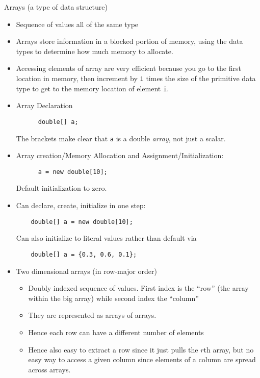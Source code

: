 \documentclass[12pt]{article}
\theoremstyle{plain}
\theoremstyle{definition}
\theoremstyle{remark}
\begin{document}
\clearpage



\clearpage
Arrays (a type of data structure)
\begin{itemize}
  \item Sequence of values all of the same type
  \item Arrays store information in a blocked portion of memory, using
    the data types to determine how much memory to allocate.
  \item Accessing elements of array are very efficient because you go to
    the first location in memory, then increment by \texttt{i} times the
    size of the primitive data type to get to the memory location of
    element \texttt{i}.
  \item Array Declaration
    \begin{lstlisting}
      double[] a;
    \end{lstlisting}
    The brackets make clear that \texttt{a} is a double \emph{array},
    not just a scalar.
  \item Array creation/Memory Allocation and Assignment/Initialization:
    \begin{lstlisting}
      a = new double[10];
    \end{lstlisting}
    Default initialization to zero.
  \item Can declare, create, initialize in one step:
    \begin{lstlisting}
    double[] a = new double[10];
    \end{lstlisting}
    Can also initialize to literal values rather than default via
    \begin{lstlisting}
    double[] a = {0.3, 0.6, 0.1};
    \end{lstlisting}
  \item Two dimensional arrays (in row-major order)
    \begin{itemize}
      \item Doubly indexed sequence of values. First index is the
        ``row'' (the array within the big array) while second index the
        ``column''
      \item They are represented as arrays of arrays.
      \item Hence each row can have a different number of elements
      \item Hence also easy to extract a row since it just pulls the
        $r$th array, but no easy way to access a given column since
        elements of a column are spread across arrays.
    \end{itemize}
\end{itemize}
\end{document}
